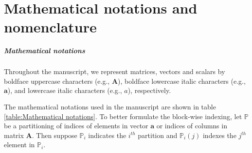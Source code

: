 \chapter*{Mathematical notations and nomenclature}
\paragraph{Mathematical notations}
Throughout the manuscript, we represent matrices, vectors and scalars by boldface uppercase characters (e.g., $\boldsymbol{A}$), boldface lowercase italic characters (e.g., $\boldsymbol{a}$), and lowercase italic characters (e.g., $a$), respectively.

The mathematical notations used in the manuscript are shown in table \ref{table:Mathematical notations}.
To better formulate the block-wise indexing, let $\mathbb{P}$ be a partitioning of indices of elements in vector $\boldsymbol{a}$ or indices of columns in matrix $\boldsymbol{A}$.
Then suppose $\mathbb{P}_i$ indicates the $i^{th}$ partition and $\mathbb{P}_i(j)$ indexes the $j^{th}$ element in $\mathbb{P}_i$. 

